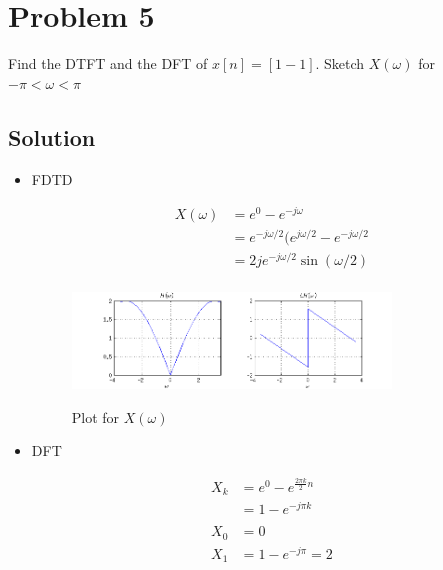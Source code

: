 \section*{Problem 5}

Find the DTFT and the DFT of $x[n] = [1 -1]$. 
Sketch $X(\omega)$ for $-π < \omega < π$

\subsection*{Solution}

\begin{itemize}
\item FDTD

\begin{equation*}
\begin{aligned}
X(\omega)  &= e^{0} - e^{-j\omega} \\
&= e^{-j\omega/2}(e^{j\omega/2} - e^{-j\omega/2} \\
&= 2 j e^{-j\omega/2} \sin(\omega/2) \\
\end{aligned}
\end{equation*} 


\begin{figure}[H]
\caption{Plot for $X(\omega)$}
\centering
\includegraphics[width=0.8\textwidth]{figs/c4p5.png}
\label{fig:c4p5}
\end{figure} 

\item DFT

\begin{equation*}
\begin{aligned}
X_k &= e^{0} - e^{\frac{2 \pi k}{2} n}\\
&= 1 - e^{-j \pi k}\\
\\
X_0 &= 0 \\
X_1 &= 1-e^{-j \pi} = 2
\end{aligned}
\end{equation*} 
\end{itemize} 
